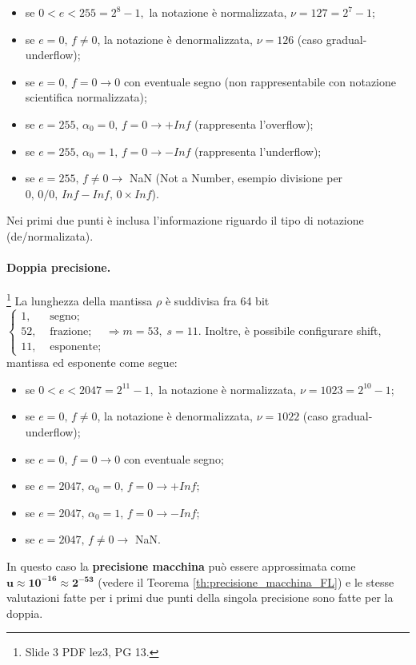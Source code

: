 \begin{itemize}
	\item se $0<e<255=2^8-1,$ la notazione è normalizzata, $\nu=127=2^7-1$;
	\item se $e=0,\, f\neq 0$, la notazione è denormalizzata, $\nu=126$ (caso gradual-underflow);
	\item se $e=0,\, f=0\rightarrow 0$ con eventuale segno (non rappresentabile con notazione scientifica normalizzata);
	\item se $e=255,\,\alpha_0=0,\,f=0\rightarrow +Inf$ (rappresenta l'overflow);
	\item se $e=255,\,\alpha_0=1,\,f=0\rightarrow -Inf$ (rappresenta l'underflow);
	\item se $e=255, \,f\neq 0 \rightarrow$ NaN (Not a Number, esempio divisione per $0,\, 0/0,\, Inf-Inf,\, 0\times Inf$).
\end{itemize}
Nei primi due punti è inclusa l'informazione riguardo il tipo di notazione (de/normalizata).

\paragraph{Doppia precisione.}\footnote{Slide 3 PDF lez3, PG 13.}
La lunghezza della mantissa $\rho$ è suddivisa fra 64 bit $\begin{cases}
	1, &\text{ segno};\\
	52, &\text{ frazione};\\
	11, &\text{ esponente};
\end{cases}\Rightarrow m=53,\; s=11$.
Inoltre, è possibile configurare shift, mantissa ed esponente come segue:
\begin{itemize}
	\item se $0<e<2047=2^{11}-1,$ la notazione è normalizzata, $\nu=1023=2^{10}-1$;
	\item se $e=0,\,f\neq 0$, la notazione è denormalizzata, $\nu=1022$ (caso gradual-underflow);
	\item se $e=0,\,f=0\rightarrow 0$ con eventuale segno;
	\item se $e=2047,\,\alpha_0=0,\,f=0\rightarrow +Inf$;
	\item se $e=2047,\,\alpha_0=1,\,f=0\rightarrow -Inf$;
	\item se $e=2047,\,f\neq 0 \rightarrow$ NaN.
\end{itemize}
In questo caso la \textbf{precisione macchina} può essere approssimata come $\boldsymbol{u\approx 10^{-16}\approx 2^{-53}}$ (vedere il Teorema \ref{th:precisione_macchina_FL}) e le stesse valutazioni fatte per i primi due punti della singola precisione sono fatte per la doppia.

